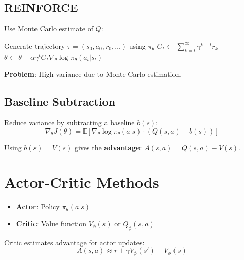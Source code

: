 \subsection{REINFORCE}

Use Monte Carlo estimate of $Q$:

\begin{algorithm}[H]
\caption{REINFORCE}
\begin{algorithmic}[1]
    \State Generate trajectory $\tau = (s_0, a_0, r_0, \ldots)$ using $\pi_\theta$
        \State $G_t \gets \sum_{k=t}^\infty \gamma^{k-t} r_k$ 
        \State $\theta \gets \theta + \alpha \gamma^t G_t \nabla_\theta \log \pi_\theta(a_t|s_t)$
    \EndFor
\EndFor
\end{algorithmic}
\end{algorithm}

\textbf{Problem}: High variance due to Monte Carlo estimation.

\subsection{Baseline Subtraction}

Reduce variance by subtracting a baseline $b(s)$:
\begin{equation}
    \nabla_\theta J(\theta) = \mathbb{E} \left[ \nabla_\theta \log \pi_\theta(a|s) \cdot (Q(s,a) - b(s)) \right]
\end{equation}

Using $b(s) = V(s)$ gives the \textbf{advantage}: $A(s,a) = Q(s,a) - V(s)$.


\section{Actor-Critic Methods}


\begin{itemize}
    \item \textbf{Actor}: Policy $\pi_\theta(a|s)$
    \item \textbf{Critic}: Value function $V_\phi(s)$ or $Q_\phi(s,a)$
\end{itemize}

Critic estimates advantage for actor updates:
\begin{equation}
    A(s,a) \approx r + \gamma V_\phi(s') - V_\phi(s)
\end{equation}


